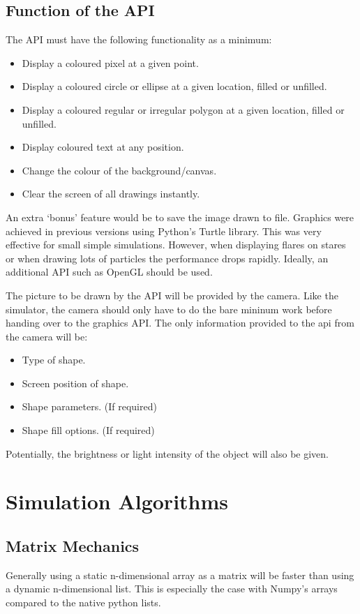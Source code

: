 \documentclass{report}
\begin{document}
    \section{Function of the API}
      The API must have the following functionality as a minimum:
      \begin{itemize}
        \item Display a coloured pixel at a given point.
        \item Display a coloured circle or ellipse at a given location, filled or unfilled.
        \item Display a coloured regular or irregular polygon at a given location, filled or unfilled.
        \item Display coloured text at any position.
        \item Change the colour of the background/canvas.
        \item Clear the screen of all drawings instantly.
      \end{itemize}
      An extra `bonus' feature would be to save the image drawn to file.
      Graphics were achieved in previous versions using Python's Turtle library. This was very effective
      for small simple simulations. However, when displaying flares on stares or when drawing lots of particles
      the performance drops rapidly. Ideally, an additional API such as OpenGL should be used.

      The picture to be drawn by the API will be provided by the camera. Like the simulator, the camera should
      only have to do the bare mininum work before handing over to the graphics API. The only information provided
      to the api from the camera will be:
      \begin{itemize}
        \item Type of shape.
        \item Screen position of shape.
        \item Shape parameters. (If required)
        \item Shape fill options. (If required)
      \end{itemize}
      Potentially, the brightness or light intensity of the object will also be given.

  \chapter{Simulation Algorithms}
    \section{Matrix Mechanics}
      Generally using a static n-dimensional array as a matrix will be
      faster than using a dynamic n-dimensional list. This is especially
      the case with Numpy's arrays compared to the native python lists.
\end{document}
